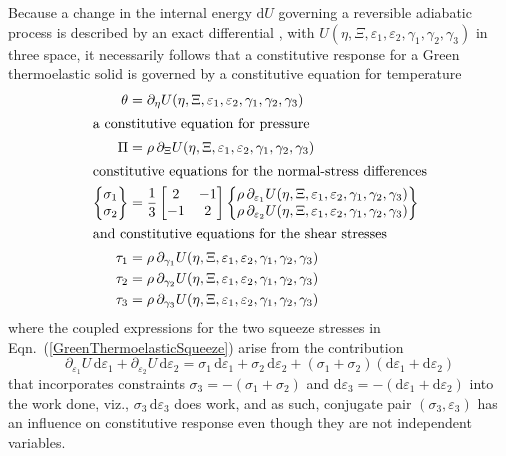 Because a change in the internal energy $\mathrm{d} U$ governing a reversible adiabatic process is described by an exact differential \cite{Caratheodory09}, with $U( \eta, \Xi, \varepsilon_1 , \varepsilon_2 , \gamma_1 , \gamma_2 , \gamma_3 )$ in three space, it necessarily follows that a constitutive response for a Green thermo\-elastic solid is governed by a constitutive equation for temperature \cite{Freed17}
\begin{subequations}
    \label{GreenThermoelasticSolid}
\begin{align}
\theta & = \partial_{\eta} U( \eta, \Xi, \varepsilon_1 , \varepsilon_2 , \gamma_1 , \gamma_2 , \gamma_3 ) \\
\intertext{a constitutive equation for pressure}
\Pi & = \rho \, \partial_{\Xi} U( \eta, \Xi, \varepsilon_1 , \varepsilon_2 , \gamma_1 , \gamma_2 , \gamma_3 )  \\
\intertext{constitutive equations for the normal-stress differences}
\left\{ \begin{matrix}
\sigma_1 \\ \sigma_2
\end{matrix} \right\} & = \frac{1}{3} \begin{bmatrix}
2 & -1 \\ -1 & 2
\end{bmatrix} \left\{ \begin{matrix}
\rho \, \partial_{\varepsilon_1} U( \eta, \Xi, \varepsilon_1 , \varepsilon_2 , \gamma_1 , \gamma_2 , \gamma_3 ) \\
\rho \, \partial_{\varepsilon_2} U( \eta, \Xi, \varepsilon_1 , \varepsilon_2 , \gamma_1 , \gamma_2 , \gamma_3 )
\end{matrix} \right\} \label{GreenThermoelasticSqueeze} \\
\intertext{and constitutive equations for the shear stresses}
\tau_1 & = \rho \, \partial_{\gamma_1} U( \eta, \Xi, \varepsilon_1 , \varepsilon_2 , \gamma_1 , \gamma_2 , \gamma_3 ) \\
\tau_2 & = \rho \, \partial_{\gamma_2} U( \eta, \Xi, \varepsilon_1 , \varepsilon_2 , \gamma_1 , \gamma_2 , \gamma_3 ) \\
\tau_3 & = \rho \, \partial_{\gamma_3} U( \eta, \Xi, \varepsilon_1 , \varepsilon_2 , \gamma_1 , \gamma_2 , \gamma_3 ) 
\end{align}
\end{subequations}
where the coupled expressions for the two squeeze stresses in Eqn.~(\ref{GreenThermoelasticSqueeze}) arise from the contribution
\begin{displaymath}
    \partial_{\varepsilon_1} U \, \mathrm{d} \varepsilon_1 +
    \partial_{\varepsilon_2} U \, \mathrm{d} \varepsilon_2 = 
    \sigma_1 \, \mathrm{d} \varepsilon_1 +
    \sigma_2 \, \mathrm{d} \varepsilon_2 + 
    (\sigma_1 + \sigma_2) (\mathrm{d} \varepsilon_1 + \mathrm{d} \varepsilon_2)
\end{displaymath}
that incorporates constraints $\sigma_3 = -(\sigma_1 + \sigma_2)$ and $\mathrm{d} \varepsilon_3 = -( \mathrm{d} \varepsilon_1 + \mathrm{d} \varepsilon_2 )$ into the work done, viz., $\sigma_3 \, \mathrm{d} \varepsilon_3$ does work, and as such, conjugate pair $( \sigma_3 , \varepsilon_3 )$ has an influence on constitutive response even though they are not independent variables.

